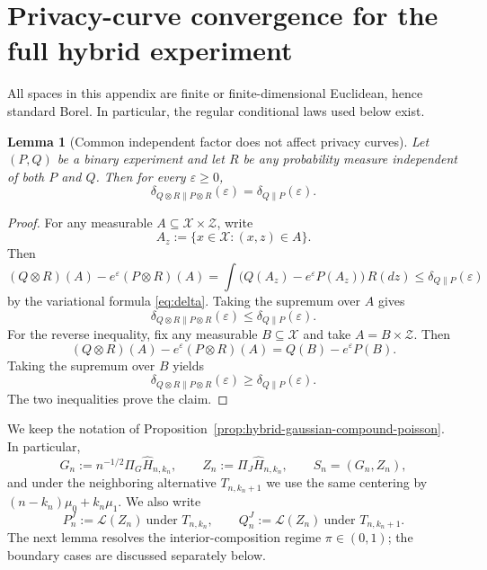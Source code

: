 \documentclass{article}
\newtheorem{lemma}[theorem]{Lemma}
\begin{document}
\section{Privacy-curve convergence for the full hybrid experiment}
\label{app:hybrid-privacy}

All spaces in this appendix are finite or finite-dimensional Euclidean, hence standard Borel. In
particular, the regular conditional laws used below exist.

\begin{lemma}[Common independent factor does not affect privacy curves]
\label{lem:common-independent-factor}
Let $(P,Q)$ be a binary experiment and let $R$ be any probability measure independent of both $P$ and $Q$. Then for every $\varepsilon \ge 0$,
\[
\delta_{Q \otimes R \| P \otimes R}(\varepsilon) = \delta_{Q \| P}(\varepsilon).
\]
\end{lemma}

\begin{proof}
For any measurable $A\subseteq\mathcal X\times\mathcal Z$, write
\[
A_z:=\{x\in\mathcal X:(x,z)\in A\}.
\]
Then
\[
(Q\otimes R)(A)-e^\varepsilon(P\otimes R)(A)
=
\int\!\bigl(Q(A_z)-e^\varepsilon P(A_z)\bigr)\,R(dz)
\le \delta_{Q\|P}(\varepsilon)
\]
by the variational formula \eqref{eq:delta}. Taking the supremum over $A$ gives
\[
\delta_{Q\otimes R\|P\otimes R}(\varepsilon)\le \delta_{Q\|P}(\varepsilon).
\]
For the reverse inequality, fix any measurable $B\subseteq\mathcal X$ and take
$A=B\times\mathcal Z$. Then
\[
(Q\otimes R)(A)-e^\varepsilon(P\otimes R)(A)=Q(B)-e^\varepsilon P(B).
\]
Taking the supremum over $B$ yields
\[
\delta_{Q\otimes R\|P\otimes R}(\varepsilon)\ge \delta_{Q\|P}(\varepsilon).
\]
The two inequalities prove the claim.
\end{proof}

We keep the notation of Proposition~\ref{prop:hybrid-gaussian-compound-poisson}. In particular,
\[
G_n:=n^{-1/2}\Pi_G\widehat H_{n,k_n},
\qquad
Z_n:=\Pi_J\widehat H_{n,k_n},
\qquad
S_n=(G_n,Z_n),
\]
and under the neighboring alternative $T_{n,k_n+1}$ we use the same centering by $(n-k_n)\mu_0+k_n\mu_1$. We also write
\[
P_n^J:=\mathcal L(Z_n)\ \text{under }T_{n,k_n},
\qquad
Q_n^J:=\mathcal L(Z_n)\ \text{under }T_{n,k_n+1}.
\]
The next lemma resolves the interior-composition regime $\pi\in(0,1)$; the boundary cases are discussed separately below.
\end{document}
